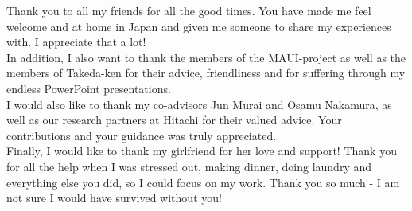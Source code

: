 \documentclass[
11pt, %
english, %
singlespacing, %
headsepline, %
]{MastersDoctoralThesis} %
\begin{document}
\begin{acknowledgements}
Thank you to all my friends for all the good times. You have made me feel welcome and at home in Japan and given me someone to share my experiences with. I appreciate that a lot!\\

In addition, I also want to thank the members of the MAUI-project as well as the members of Takeda-ken for their advice, friendliness and for suffering through my endless PowerPoint presentations.\\ 

I would also like to thank my co-advisors Jun Murai and Osamu Nakamura, as well as our research partners at Hitachi for their valued advice. Your contributions and your guidance was truly appreciated.\\

Finally, I would like to thank my girlfriend for her love and support! Thank you for all the help when I was stressed out, making dinner, doing laundry and everything else you did, so I could focus on my work. Thank you so much - I am not sure I would have survived without you!
\end{acknowledgements}




\tableofcontents %

\listoffigures %

\listoftables %

\end{document}

